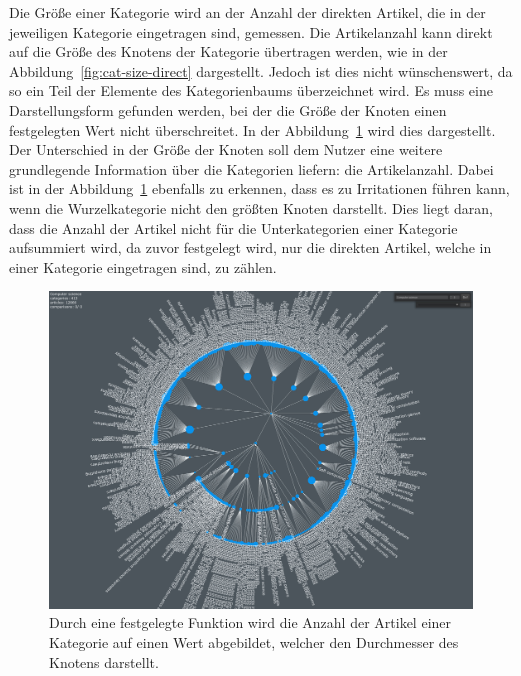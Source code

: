 Die Größe einer Kategorie wird an der Anzahl der direkten Artikel, die in der jeweiligen Kategorie eingetragen sind, gemessen.
Die Artikelanzahl kann direkt auf die Größe des Knotens der Kategorie übertragen werden, wie in der Abbildung~\ref{fig:cat-size-direct} dargestellt.
Jedoch ist dies nicht wünschenswert, da so ein Teil der Elemente des Kategorienbaums überzeichnet wird.
Es muss eine Darstellungsform gefunden werden, bei der die Größe der Knoten einen festgelegten Wert nicht überschreitet. 
In der Abbildung~\ref{fig:cat-size-fixed} wird dies dargestellt.
Der Unterschied in der Größe der Knoten soll dem Nutzer eine weitere grundlegende Information über die Kategorien liefern: die Artikelanzahl.
Dabei ist in der Abbildung~\ref{fig:cat-size-fixed} ebenfalls zu erkennen, dass es zu Irritationen führen kann, wenn die Wurzelkategorie nicht den größten Knoten darstellt.
Dies liegt daran, dass die Anzahl der Artikel nicht für die Unterkategorien einer Kategorie aufsummiert wird, da zuvor festgelegt wird, nur die direkten Artikel, welche in einer Kategorie eingetragen sind, zu zählen.

\begin{figure}[H]
    \centering
    \includegraphics[width=\textwidth]{images/cat-size-fixed}
    \caption{Durch eine festgelegte Funktion wird die Anzahl der Artikel einer Kategorie auf einen Wert abgebildet, welcher den Durchmesser des Knotens darstellt.}
    \label{fig:cat-size-fixed}
\end{figure}

